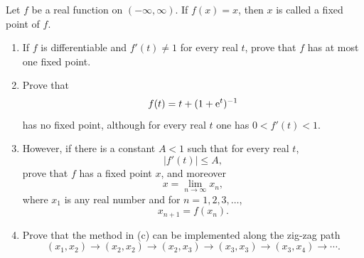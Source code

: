 \documentclass{article}
\begin{document}
\begin{problem}[5-22]
Let $f$ be a real function on $(-\infty,\infty)$. If $f(x)=x$, then $x$ is called a fixed point of $f$.
\begin{enumerate}[label=(\alph*)]
	\item If $f$ is differentiable and $f'(t)\ne 1$ for every real $t$, prove that $f$ has at most one fixed point.
	\item Prove that
	\[
	f(t)=t+(1+\mathrm{e}^t)^{-1}
	\]
	has no fixed point, although for every real $t$ one has $0<f'(t)<1$.
	\item However, if there is a constant $A<1$ such that for every real $t$,
	\[
	|f'(t)|\le A,
	\]
	prove that $f$ has a fixed point $x$, and moreover
	\[
	x=\lim_{n\to\infty}x_n,
	\]
	where $x_1$ is any real number and for $n=1,2,3,\ldots$,
	\[
	x_{n+1}=f(x_n).
	\]
	\item Prove that the method in (c) can be implemented along the zig-zag path
	\[
	(x_1,x_2)\to(x_2,x_2)\to(x_2,x_3)\to(x_3,x_3)\to(x_3,x_4)\to\cdots.
	\]
\end{enumerate}
\end{problem}
\end{document}
